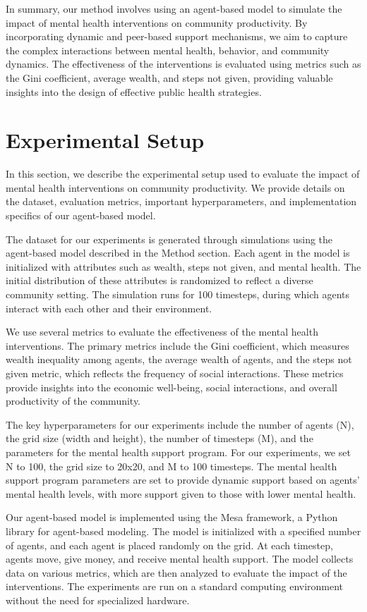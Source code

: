 \documentclass{article} %
\begin{document}
In summary, our method involves using an agent-based model to simulate the impact of mental health interventions on community productivity. By incorporating dynamic and peer-based support mechanisms, we aim to capture the complex interactions between mental health, behavior, and community dynamics. The effectiveness of the interventions is evaluated using metrics such as the Gini coefficient, average wealth, and steps not given, providing valuable insights into the design of effective public health strategies.

\section{Experimental Setup}
\label{sec:experimental}

In this section, we describe the experimental setup used to evaluate the impact of mental health interventions on community productivity. We provide details on the dataset, evaluation metrics, important hyperparameters, and implementation specifics of our agent-based model.

The dataset for our experiments is generated through simulations using the agent-based model described in the Method section. Each agent in the model is initialized with attributes such as wealth, steps not given, and mental health. The initial distribution of these attributes is randomized to reflect a diverse community setting. The simulation runs for 100 timesteps, during which agents interact with each other and their environment.

We use several metrics to evaluate the effectiveness of the mental health interventions. The primary metrics include the Gini coefficient, which measures wealth inequality among agents, the average wealth of agents, and the steps not given metric, which reflects the frequency of social interactions. These metrics provide insights into the economic well-being, social interactions, and overall productivity of the community.

The key hyperparameters for our experiments include the number of agents (N), the grid size (width and height), the number of timesteps (M), and the parameters for the mental health support program. For our experiments, we set N to 100, the grid size to 20x20, and M to 100 timesteps. The mental health support program parameters are set to provide dynamic support based on agents' mental health levels, with more support given to those with lower mental health.

Our agent-based model is implemented using the Mesa framework, a Python library for agent-based modeling. The model is initialized with a specified number of agents, and each agent is placed randomly on the grid. At each timestep, agents move, give money, and receive mental health support. The model collects data on various metrics, which are then analyzed to evaluate the impact of the interventions. The experiments are run on a standard computing environment without the need for specialized hardware.
\end{document}
